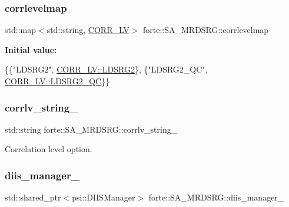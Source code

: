 \subsubsection{\texorpdfstring{corrlevelmap}{corrlevelmap}}
{\footnotesize\ttfamily std\+::map$<$std\+::string, \mbox{\hyperlink{classforte_1_1_s_a___m_r_d_s_r_g_ae418b53108b2015f68d267bb26d3e6ba}{C\+O\+R\+R\+\_\+\+LV}}$>$ forte\+::\+S\+A\+\_\+\+M\+R\+D\+S\+R\+G\+::corrlevelmap\hspace{0.3cm}{\ttfamily [protected]}}

{\bfseries Initial value\+:}
\begin{DoxyCode}
\{\{\textcolor{stringliteral}{"LDSRG2"}, \mbox{\hyperlink{classforte_1_1_s_a___m_r_d_s_r_g_ae418b53108b2015f68d267bb26d3e6baa24dbc64461c4bd5e7f00f2742bc02943}{CORR\_LV::LDSRG2}}\},
                                                \{\textcolor{stringliteral}{"LDSRG2\_QC"}, \mbox{\hyperlink{classforte_1_1_s_a___m_r_d_s_r_g_ae418b53108b2015f68d267bb26d3e6baa852a93207553b725f17b8e1d921bbe6f}{CORR\_LV::LDSRG2\_QC}}\}\}
\end{DoxyCode}
\mbox{\label{classforte_1_1_s_a___m_r_d_s_r_g_aa0734bdace1a7c5ae1f0215e337bf963}} 
\subsubsection{\texorpdfstring{corrlv\+\_\+string\+\_\+}{corrlv\_string\_}}
{\footnotesize\ttfamily std\+::string forte\+::\+S\+A\+\_\+\+M\+R\+D\+S\+R\+G\+::corrlv\+\_\+string\+\_\+\hspace{0.3cm}{\ttfamily [protected]}}



Correlation level option. 

\mbox{\label{classforte_1_1_s_a___m_r_d_s_r_g_a23cf86be98b2a7b682cfec6cacb22c6c}} 
\subsubsection{\texorpdfstring{diis\+\_\+manager\+\_\+}{diis\_manager\_}}
{\footnotesize\ttfamily std\+::shared\+\_\+ptr$<$psi\+::\+D\+I\+I\+S\+Manager$>$ forte\+::\+S\+A\+\_\+\+M\+R\+D\+S\+R\+G\+::diis\+\_\+manager\+\_\+\hspace{0.3cm}{\ttfamily [protected]}}



